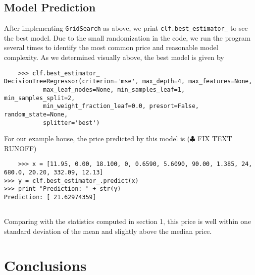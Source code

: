 \documentclass[12 pt]{article}
\numberwithin{equation}{section}
\begin{document}
\subsection{Model Prediction}
After implementing \texttt{GridSearch} as above, we print \texttt{clf.best\_estimator\_} to see the best model. Due to the small randomization in the code, we run the program several times to identify the most common price and reasonable model complexity. As we determined visually above, the best model is given by 
\begin{verbatim}
	>>> clf.best_estimator_
DecisionTreeRegressor(criterion='mse', max_depth=4, max_features=None,
           max_leaf_nodes=None, min_samples_leaf=1, min_samples_split=2,
           min_weight_fraction_leaf=0.0, presort=False, random_state=None,
           splitter='best')
\end{verbatim}
For our example house, the price predicted by this model is ($\clubsuit$ FIX TEXT RUNOFF)
\begin{verbatim}
	>>> x = [11.95, 0.00, 18.100, 0, 0.6590, 5.6090, 90.00, 1.385, 24, 680.0, 20.20, 332.09, 12.13]	
>>> y = clf.best_estimator_.predict(x)
>>> print "Prediction: " + str(y)
Prediction: [ 21.62974359]
    
\end{verbatim}
Comparing with the statistics computed in section 1, this price is well within one standard deviation of the mean and slightly above the median price.

\section{Conclusions}
\end{document}
